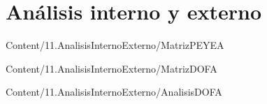 \section{Análisis interno y externo}

{Content/11.AnalisisInternoExterno/MatrizPEYEA}

{Content/11.AnalisisInternoExterno/MatrizDOFA}

{Content/11.AnalisisInternoExterno/AnalisisDOFA}